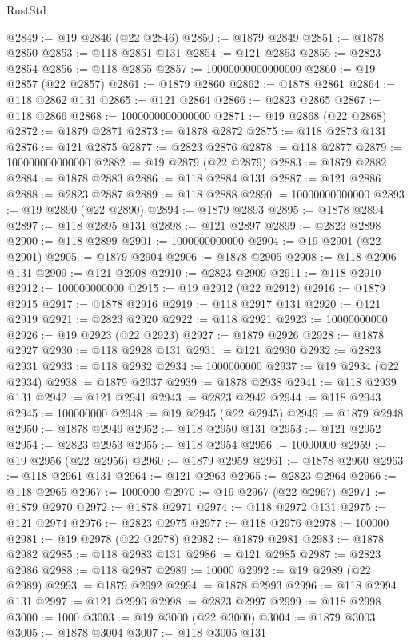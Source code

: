 \begin{lexlean}{RustStd}
\begin{coremodule}
@2849 := @19 @2846 (@22 @2846)
@2850 := @1879 @2849
@2851 := @1878 @2850
@2853 := @118 @2851 @131
@2854 := @121 @2853
@2855 := @2823 @2854
@2856 := @118 @2855
@2857 := 10000000000000000
@2860 := @19 @2857 (@22 @2857)
@2861 := @1879 @2860
@2862 := @1878 @2861
@2864 := @118 @2862 @131
@2865 := @121 @2864
@2866 := @2823 @2865
@2867 := @118 @2866
@2868 := 1000000000000000
@2871 := @19 @2868 (@22 @2868)
@2872 := @1879 @2871
@2873 := @1878 @2872
@2875 := @118 @2873 @131
@2876 := @121 @2875
@2877 := @2823 @2876
@2878 := @118 @2877
@2879 := 100000000000000
@2882 := @19 @2879 (@22 @2879)
@2883 := @1879 @2882
@2884 := @1878 @2883
@2886 := @118 @2884 @131
@2887 := @121 @2886
@2888 := @2823 @2887
@2889 := @118 @2888
@2890 := 10000000000000
@2893 := @19 @2890 (@22 @2890)
@2894 := @1879 @2893
@2895 := @1878 @2894
@2897 := @118 @2895 @131
@2898 := @121 @2897
@2899 := @2823 @2898
@2900 := @118 @2899
@2901 := 1000000000000
@2904 := @19 @2901 (@22 @2901)
@2905 := @1879 @2904
@2906 := @1878 @2905
@2908 := @118 @2906 @131
@2909 := @121 @2908
@2910 := @2823 @2909
@2911 := @118 @2910
@2912 := 100000000000
@2915 := @19 @2912 (@22 @2912)
@2916 := @1879 @2915
@2917 := @1878 @2916
@2919 := @118 @2917 @131
@2920 := @121 @2919
@2921 := @2823 @2920
@2922 := @118 @2921
@2923 := 10000000000
@2926 := @19 @2923 (@22 @2923)
@2927 := @1879 @2926
@2928 := @1878 @2927
@2930 := @118 @2928 @131
@2931 := @121 @2930
@2932 := @2823 @2931
@2933 := @118 @2932
@2934 := 1000000000
@2937 := @19 @2934 (@22 @2934)
@2938 := @1879 @2937
@2939 := @1878 @2938
@2941 := @118 @2939 @131
@2942 := @121 @2941
@2943 := @2823 @2942
@2944 := @118 @2943
@2945 := 100000000
@2948 := @19 @2945 (@22 @2945)
@2949 := @1879 @2948
@2950 := @1878 @2949
@2952 := @118 @2950 @131
@2953 := @121 @2952
@2954 := @2823 @2953
@2955 := @118 @2954
@2956 := 10000000
@2959 := @19 @2956 (@22 @2956)
@2960 := @1879 @2959
@2961 := @1878 @2960
@2963 := @118 @2961 @131
@2964 := @121 @2963
@2965 := @2823 @2964
@2966 := @118 @2965
@2967 := 1000000
@2970 := @19 @2967 (@22 @2967)
@2971 := @1879 @2970
@2972 := @1878 @2971
@2974 := @118 @2972 @131
@2975 := @121 @2974
@2976 := @2823 @2975
@2977 := @118 @2976
@2978 := 100000
@2981 := @19 @2978 (@22 @2978)
@2982 := @1879 @2981
@2983 := @1878 @2982
@2985 := @118 @2983 @131
@2986 := @121 @2985
@2987 := @2823 @2986
@2988 := @118 @2987
@2989 := 10000
@2992 := @19 @2989 (@22 @2989)
@2993 := @1879 @2992
@2994 := @1878 @2993
@2996 := @118 @2994 @131
@2997 := @121 @2996
@2998 := @2823 @2997
@2999 := @118 @2998
@3000 := 1000
@3003 := @19 @3000 (@22 @3000)
@3004 := @1879 @3003
@3005 := @1878 @3004
@3007 := @118 @3005 @131

\end{coremodule}
\end{lexlean}
